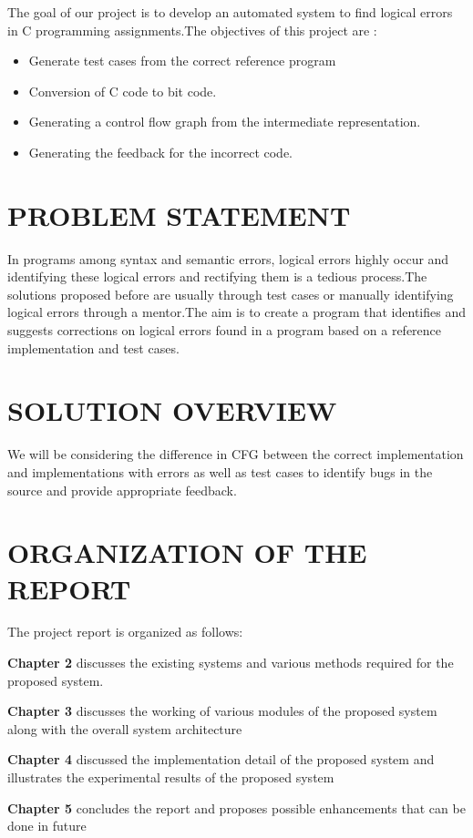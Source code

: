 The goal of our project is to develop an automated system to find logical errors in C programming assignments.The objectives of this project are :
\begin{itemize}
\item Generate test cases from the correct reference program
\item Conversion of C code to bit code.
\item Generating a control flow graph from the intermediate representation.
\item Generating the feedback for the incorrect code.\end{itemize}
\section{\uppercase{PROBLEM STATEMENT}}
In programs among syntax and semantic errors, logical errors highly occur and identifying these logical errors and rectifying them is a tedious process.The solutions proposed before are usually through test cases or manually identifying logical errors through a mentor.The aim is to create a program that identifies and suggests corrections on logical errors found in a program based on a reference implementation and test cases.

\section{\uppercase{SOLUTION OVERVIEW}}
We will be considering the difference in CFG between the correct implementation and implementations with errors as well as test cases to identify bugs in the source and provide appropriate feedback.

\section{\uppercase{ORGANIZATION OF THE REPORT}}
The project report is organized as follows:

\textbf{Chapter 2} discusses the existing systems and various methods required for the proposed system.

\textbf{Chapter 3} discusses the working of various modules of the proposed system along with the overall system architecture

\textbf{Chapter 4} discussed the implementation detail of the proposed system and illustrates the experimental results of the proposed system

\textbf{Chapter 5} concludes the report and proposes possible enhancements  that can be done in future 



